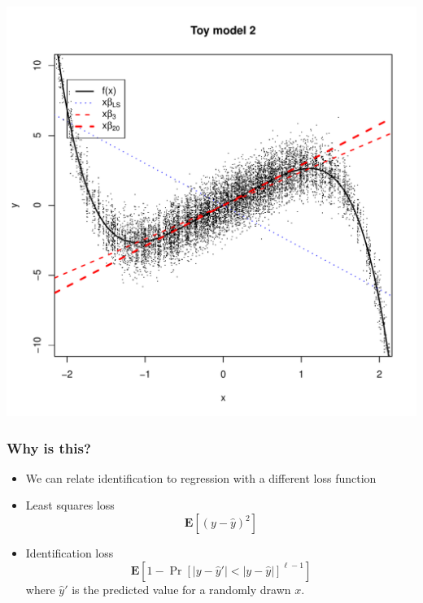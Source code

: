\documentclass{beamer}
\newcommand{\E}{\textbf{E}}
\begin{document}
\begin{frame}
\begin{center}
\includegraphics[scale = 0.4]{toy3a_plot2.pdf}
\end{center}
\end{frame}

\begin{frame}
\frametitle{Why is this?}
\begin{itemize}
\item We can relate identification to regression with a different loss function
\item
Least squares loss
\[
\E[(y - \hat{y})^2]
\]
\item
Identification loss
\[
\E[1 - \Pr[|y - \hat{y}'| < |y - \hat{y}|]^{\ell - 1}]
\]
where $\hat{y}'$ is the predicted value for a randomly drawn $x$.
\end{itemize}
\end{frame}
\end{document}
